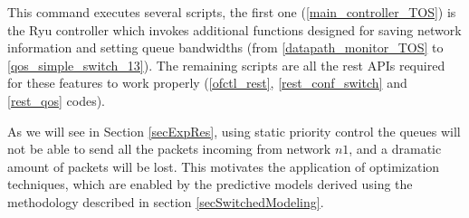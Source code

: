 \noindent This command executes several scripts, the first one (\ref{main_controller_TOS}) is the Ryu controller which invokes additional functions designed for saving network information and setting queue bandwidths (from \ref{datapath_monitor_TOS} to \ref{qos_simple_switch_13}). The remaining scripts are all the rest APIs required for these features to work properly (\ref{ofctl_rest}, \ref{rest_conf_switch} and \ref{rest_qos} codes).

As we will see in Section \ref{secExpRes}, using static priority control the queues will not be able to send all the packets incoming from network $n1$, and a dramatic amount of packets will be lost. This motivates the application of optimization techniques, which are enabled by the predictive models derived using the methodology described in section \ref{secSwitchedModeling}.

